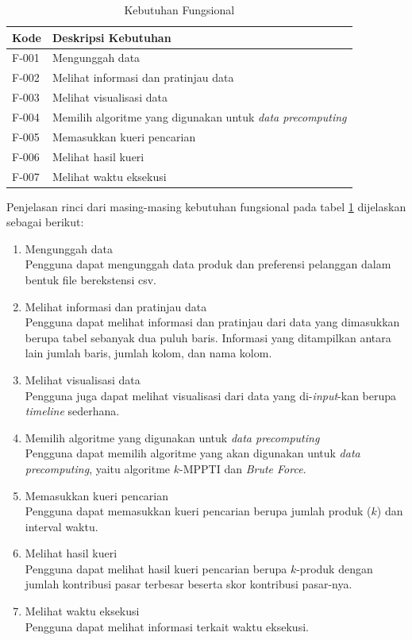 \begin{table}[H]
	\centering
	\begin{tabular}{ | p{2cm} | p{7cm} | }
		\hline
		\textbf{Kode} & \textbf{Deskripsi Kebutuhan} \\ \hline \hline
		F-001 & Mengunggah data \\ \hline
		F-002 & Melihat informasi dan pratinjau data \\ \hline
		F-003 & Melihat visualisasi data  \\ \hline
		F-004 & Memilih algoritme yang digunakan untuk \textit{data precomputing}\\ \hline
		F-005 & Memasukkan kueri pencarian \\ \hline
		F-006 & Melihat hasil kueri \\ \hline
		F-007 & Melihat waktu eksekusi \\ \hline
	\end{tabular} \caption{Kebutuhan Fungsional}
	\label{tab:kebutuhan-fungsional}
\end{table}

Penjelasan rinci dari masing-masing kebutuhan fungsional pada tabel \ref{tab:kebutuhan-fungsional} dijelaskan sebagai berikut:
\begin{enumerate}
	\item Mengunggah data\\
	Pengguna dapat mengunggah data produk dan preferensi pelanggan dalam bentuk file berekstensi csv.
	\item Melihat informasi dan pratinjau data \\
	Pengguna dapat melihat informasi dan pratinjau dari data yang dimasukkan berupa tabel sebanyak dua puluh baris. Informasi yang ditampilkan antara lain jumlah baris, jumlah kolom, dan nama kolom.
	\item Melihat visualisasi data \\
	Pengguna juga dapat melihat visualisasi dari data yang di-\textit{input}-kan berupa \textit{timeline} sederhana.
	\item Memilih algoritme yang digunakan untuk \textit{data precomputing} \\
	Pengguna dapat memilih algoritme yang akan digunakan untuk \textit{data precomputing}, yaitu algoritme $k$-MPPTI dan \textit{Brute Force}.
	\item Memasukkan kueri pencarian \\
	Pengguna dapat memasukkan kueri pencarian berupa jumlah produk ($k$) dan interval waktu.
	\item Melihat hasil kueri \\
	Pengguna dapat melihat hasil kueri pencarian berupa $k$-produk dengan jumlah kontribusi pasar terbesar beserta skor kontribusi pasar-nya. 
	\item Melihat waktu eksekusi \\
	Pengguna dapat melihat informasi terkait waktu eksekusi.
\end{enumerate}


